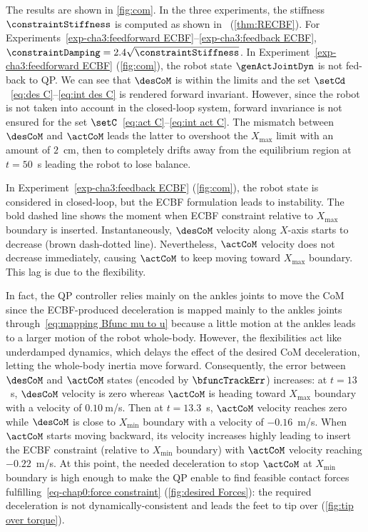 The results are shown in \cref{fig:com}. In the three experiments, the stiffness $\constraintStiffness$ is computed as shown in~\cite{djeha2020ral} (\cref{thm:RECBF}). For Experiments~\cref{exp-cha3:feedforward ECBF}--\cref{exp-cha3:feedback ECBF}, $\constraintDamping = 2.4\sqrt{\constraintStiffness}$. In Experiment~\cref{exp-cha3:feedforward ECBF} (\cref{fig:com}), the robot state $\genActJointDyn$ is not fed-back to QP.  
We can see that $\desCoM$ is within the limits and the set $\setCd$~\eqref{eq:des C}--\eqref{eq:int des C} is rendered forward invariant. However, since the robot is not taken into account in the closed-loop system, forward invariance is not ensured for the set $\setC$~\cref{eq:act C}--\cref{eq:int act C}. The mismatch between $\desCoM$ and $\actCoM$  leads the latter to overshoot the  $X_{\max}$ limit with an amount of $2$~cm, then to completely drifts away from the equilibrium region  at $t=50$~s leading the robot to lose balance.

In Experiment~\cref{exp-cha3:feedback ECBF} (\cref{fig:com}), the robot state is considered in closed-loop, but the ECBF formulation leads to instability. The bold dashed line shows the moment when ECBF constraint relative to ${X}_{\max}$ boundary is inserted. Instantaneously, $\desCoM$ velocity along ${X}$-axis starts to decrease (brown dash-dotted line). Nevertheless, $\actCoM$ velocity does not decrease immediately, causing $\actCoM$ to keep moving toward ${X}_{\max}$ boundary. This lag is due to the flexibility. 

In fact, the QP controller relies mainly on the ankles joints to move the CoM since the ECBF-produced deceleration is mapped mainly to the ankles joints through~\cref{eq:mapping Bfunc mu to u} because a little motion at the ankles leads to a larger motion of the robot whole-body. However, the flexibilities act like underdamped dynamics, which delays the effect of the desired CoM deceleration, letting the whole-body inertia move forward. Consequently, the error between $\desCoM$ and $\actCoM$ states (encoded by $\bfuncTrackErr$) increases:  at $t=13$~s, $\desCoM$ velocity is zero whereas $\actCoM$ is heading toward ${X}_{\max}$ boundary with a velocity of $0.10~$m/s. Then at $t=13.3$~s, $\actCoM$ velocity reaches zero while $\desCoM$ is close to ${X}_{\min}$  boundary with a velocity of $-0.16$~m/s. When $\actCoM$ starts moving backward, its velocity increases highly leading to insert the ECBF constraint (relative to ${X}_{\min}$ boundary) with $\actCoM$ velocity reaching $-0.22$~m/s. At this point, the needed deceleration to stop $\actCoM$ at ${X}_{\min}$ boundary is high enough to make the QP enable to find feasible contact forces fulfilling~\cref{eq-chap0:force constraint} (\cref{fig:desired Forces}): the required deceleration is not dynamically-consistent and leads the feet to tip over (\cref{fig:tip over torque}).


